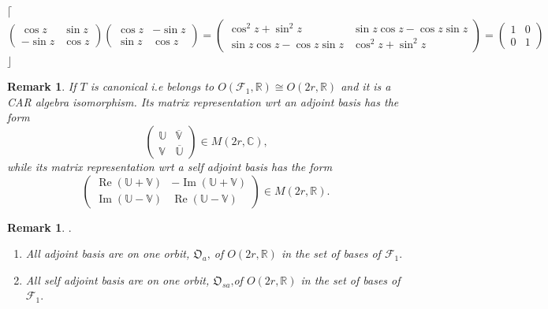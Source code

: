 \documentclass[aps, preprint]{revtex4}
\newtheorem{remark}[theorem]{Remark}
\begin{document}
$\lceil $
\begin{equation}\left (\begin{array}{cc}\cos  z & \sin  z \\
 -\sin  z & \cos  z\end{array}\right ) \left (\begin{array}{cc}\cos  z &  -\sin  z \\
\sin  z & \cos  z\end{array}\right ) =\left (\begin{array}{cc}\cos ^{2} z +\sin ^{2} z & \sin  z \cos  z -\cos  z \sin  z \\
\sin  z \cos  z -\cos  z \sin  z & \cos ^{2} z +\sin ^{2} z\end{array}\right ) =\left (\begin{array}{cc}1 & 0 \\
0 & 1\end{array}\right )
\end{equation}$\rfloor $ 


\begin{remark}
If $T$ is canonical i.e belongs to $O \left (\mathcal{F}_{1} ,\mathbb{R}\right ) \cong O \left (2 r ,\mathbb{R}\right )$ and it is a CAR algebra isomorphism. Its matrix representation wrt an adjoint basis has the form
\begin{equation}\left (\begin{array}{cc}\mathbb{U} & \overline{\mathbb{V}} \\
\mathbb{V} & \overline{\mathbb{U}}\end{array}\right ) \in M \left (2 r ,\mathbb{C}\right )\text{,}
\end{equation}while its matrix representation wrt a self adjoint basis has the form
\begin{equation}\left (\begin{array}{cc}\ensuremath{\operatorname*{Re}} \left (\mathbb{U} +\mathbb{V}\right ) &  -\ensuremath{\operatorname*{Im}} \left (\mathbb{U} +\mathbb{V}\right ) \\
\ensuremath{\operatorname*{Im}} \left (\mathbb{U} -\mathbb{V}\right ) & \ensuremath{\operatorname*{Re}} \left (\mathbb{U} -\mathbb{V}\right )\end{array}\right ) \in M \left (2 r ,\mathbb{R}\right )\text{.}
\end{equation}
\end{remark}


\begin{remark}
$\text{.}$ 


\begin{enumerate}
\item All \emph{adjoint basis} are on \emph{one }orbit, $\mathfrak{O}_{a}\text{,}$ of $O \left (2 r ,\mathbb{R}\right )$ in the set of bases of $\mathcal{F}_{1}\text{.}$ 

\item All \emph{self adjoint basis} are on \emph{one}
orbit, $\mathfrak{O}_{s a}\text{,}$of $O \left (2 r ,\mathbb{R}\right )$ in the set of bases of $\mathcal{F}_{1}\text{.}$ \end{enumerate}
\end{remark}
\end{document}
